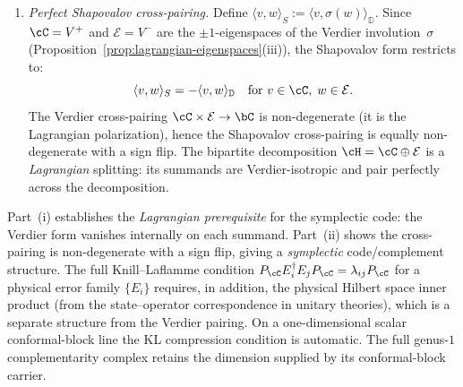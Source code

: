 \begin{proposition}
\begin{enumerate}[label=\textup{(\roman*)}]
\item \emph{Perfect Shapovalov cross-pairing.}
 Define $\langle v, w \rangle_S := \langle v, \sigma(w)
 \rangle_{\mathbb{D}}$.
 Since $\cC = V^+$ and $\mathcal E = V^-$ are the $\pm1$-eigenspaces
 of the Verdier involution~$\sigma$
 \textup{(}Proposition~\textup{\ref{prop:lagrangian-eigenspaces}(iii)}\textup{)},
 the Shapovalov form restricts to:
 \begin{equation}\label{eq:hc-shapovalov-cross-pairing}
 \langle v, w \rangle_S = -\langle v, w \rangle_{\mathbb{D}}
 \quad\text{for } v \in \cC,\; w \in \mathcal E.
 \end{equation}
 The Verdier cross-pairing
 $\cC \times \mathcal E \to \bC$ is non-degenerate
 \textup{(}it is the Lagrangian polarization\textup{)},
 hence the Shapovalov cross-pairing is equally non-degenerate
 with a sign flip.
 The bipartite decomposition
 $\cH = \cC \oplus \mathcal E$ is a \emph{Lagrangian}
 splitting: its summands are Verdier-isotropic and pair perfectly
 across the decomposition.
\end{enumerate}

\smallskip\noindent
Part~(i) establishes the \emph{Lagrangian prerequisite}
for the symplectic code: the Verdier form vanishes internally on each
summand.
Part~(ii) shows the cross-pairing is non-degenerate
with a sign flip, giving a \emph{symplectic}
code/complement structure.
The full Knill--Laflamme condition
$P_\cC E_i^\dagger E_j P_\cC = \lambda_{ij} P_\cC$
for a physical error family $\{E_i\}$
requires, in addition, the physical Hilbert space inner product
\textup{(}from the state--operator correspondence
in unitary theories\textup{)}, which is a separate
structure from the Verdier pairing.
On a one-dimensional scalar conformal-block line the KL compression
condition is automatic.  The full genus-$1$ complementarity complex
retains the dimension supplied by its conformal-block carrier.
\end{proposition}

